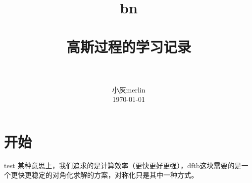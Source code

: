 \documentclass[a4paper, 12pt, CJKnumber, UTF8, openany,nofonts, fancyhdr]{ctexbook}
\title{
        \usefont{OT1}{bch} {b}{n}
        \normalfont \normalsize \textsc{} \\ [25pt]
        \horrule{1.5pt} \\[0.4cm]
        \huge 高斯过程的学习记录\\
        \horrule{1.5pt} \\[0.5cm]
}
\author {
        \normalfont                                 \normalsize
        小灰merlin\\[-2pt]      \normalsize
        \today
}
\date{}
\begin{document}
\linespread{1.69}\selectfont
\maketitle
\eject
\tableofcontents
\eject

\frontmatter %
\linespread{1.4}


\selectfont
\renewcommand*{\contentsname}{目\qquad 录}
\renewcommand*\listfigurename{\textbf{插\ 图\ 目\ 录}}
\renewcommand*\listtablename{\textbf{表\ 格\ 目\ 录}}
\renewcommand*\bibname{\textbf{参\ 考\ 文\ 献}}

\mainmatter %
\linespread{1.5}\selectfont
\setlength{\topskip}{0mm}
\newcommand{\upcite}[1]{\textsuperscript{\textsuperscript{\cite{#1}}}}

\section{开始}
test
某种意思上，我们追求的是计算效率（更快更好更强），dftb这块需要的是一个更快更稳定的对角化求解的方案，对称化只是其中一种方式。
\end{document}

